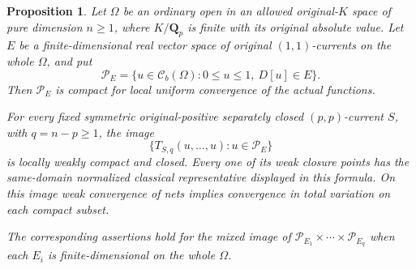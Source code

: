\documentclass[11pt,a4paper]{article}
\numberwithin{equation}{section}
\newtheorem{proposition}[theorem]{Proposition}
\theoremstyle{definition}
\theoremstyle{remark}
\begin{document}
\begin{proposition}
\label{prop:r5-global-finite-curvature-compactness}
Let $\Omega$ be an ordinary open in an allowed original-$K$
space of pure dimension $n\ge1$, where $K/\mathbf Q_p$ is
finite with its original absolute value.  Let $E$ be a
finite-dimensional real vector space of original $(1,1)$-currents
on the \emph{whole} $\Omega$, and put
\[
 \mathcal P_E=
 \{u\in\mathcal C_b(\Omega):0\le u\le1,\ D[u]\in E\}.
\]
Then $\mathcal P_E$ is compact for local uniform convergence
of the actual functions.

For every fixed symmetric original-positive separately closed
$(p,p)$-current $S$, with $q=n-p\ge1$, the image
\[
       \{T_{S,q}(u,\ldots,u):u\in\mathcal P_E\}
\]
is locally weakly compact and closed.  Every one of its weak
closure points has the same-domain normalized classical
representative displayed in this formula.  On this image
weak convergence of nets implies convergence in total
variation on each compact subset.

The corresponding assertions hold for the mixed image of
$\mathcal P_{E_1}\times\cdots\times\mathcal P_{E_q}$ when
each $E_i$ is finite-dimensional on the whole $\Omega$.
\end{proposition}
\end{document}
